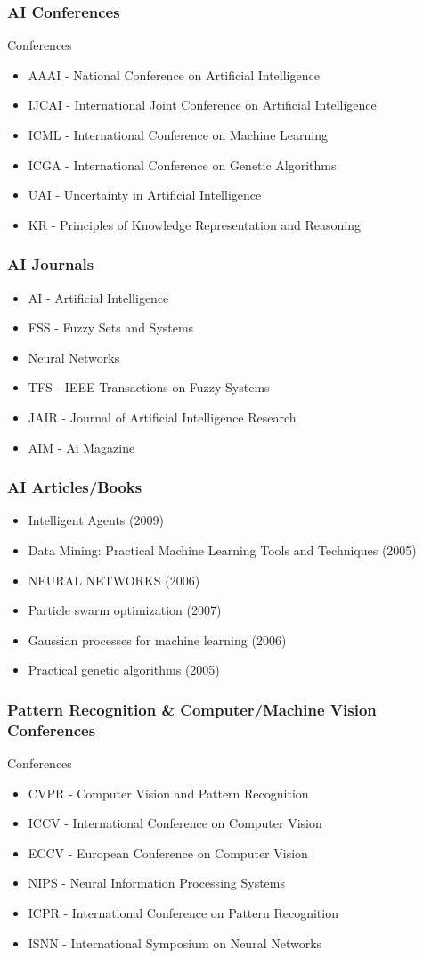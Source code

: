 \documentclass[8pt]{beamer}
\begin{document}
\begin{frame}
\frametitle{AI Conferences}
Conferences
\begin{itemize}
\item AAAI - National Conference on Artificial Intelligence
\item IJCAI - International Joint Conference on Artificial Intelligence
\item ICML - International Conference on Machine Learning
\item ICGA - International Conference on Genetic Algorithms
\item UAI - Uncertainty in Artificial Intelligence
\item KR - Principles of Knowledge Representation and Reasoning
\end{itemize}
\end{frame}

\begin{frame}
\frametitle{AI Journals}
\begin{itemize}
\item AI - Artificial Intelligence
\item FSS - Fuzzy Sets and Systems
\item Neural Networks
\item TFS - IEEE Transactions on Fuzzy Systems
\item JAIR - Journal of Artificial Intelligence Research
\item AIM - Ai Magazine
\end{itemize}
\end{frame}

\begin{frame}
\frametitle{AI Articles/Books}
\begin{itemize}
\item Intelligent Agents (2009)
\item Data Mining: Practical Machine Learning Tools and Techniques (2005)
\item NEURAL NETWORKS (2006)
\item Particle swarm optimization (2007)
\item Gaussian processes for machine learning (2006)
\item Practical genetic algorithms (2005)
\end{itemize}
\end{frame}

\begin{frame}
\frametitle{Pattern Recognition \& Computer/Machine Vision Conferences}
Conferences
\begin{itemize}
\item CVPR - Computer Vision and Pattern Recognition
\item ICCV - International Conference on Computer Vision
\item ECCV - European Conference on Computer Vision
\item NIPS - Neural Information Processing Systems
\item ICPR - International Conference on Pattern Recognition
\item ISNN - International Symposium on Neural Networks
\end{itemize}
\end{frame}
\end{document}
